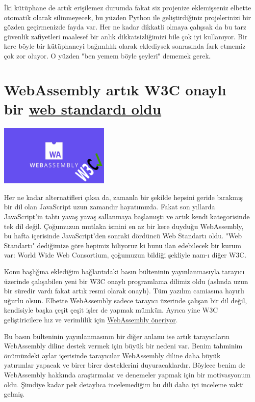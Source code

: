 \documentclass[11pt]{article}
\begin{document}
İki kütüphane de artık erişilemez durumda fakat siz projenize eklemişseniz
elbette otomatik olarak silinmeyecek, bu yüzden Python ile geliştirdiğiniz
projelerinizi bir gözden geçirmenizde fayda var. Her ne kadar dikkatli olmaya
çalışsak da bu tarz güvenlik zafiyetleri maalesef bir anlık dikkatsizliğimizi
bile çok iyi kullanıyor. Bir kere böyle bir kütüphaneyi bağımlılık olarak
eklediysek sonrasında fark etmemiz çok zor oluyor. O yüzden "ben yemem böyle
şeyleri" dememek gerek.
\section{WebAssembly artık W3C onaylı bir \href{https://www.w3.org/2019/12/pressrelease-wasm-rec.html.en}{web standardı oldu}}
\label{sec:org3f7b3a4}
\begin{center}
\includegraphics[height=3cm]{gorseller/webassembly-w3c.png}
\end{center}

Her ne kadar alternatifleri çıksa da, zamanla bir şekilde hepsini geride
bırakmış bir dil olan JavaScript uzun zamandır hayatımızda. Fakat son yıllarda
JavaScript'in tahtı yavaş yavaş sallanmaya başlamıştı ve artık kendi
kategorisinde tek dil değil. Çoğumuzun mutlaka ismini en az bir kere duyduğu
WebAssembly, bu hafta içerisinde JavaScript'den sonraki dördüncü Web Standartı
oldu. "Web Standartı" dediğimize göre hepimiz biliyoruz ki bunu ilan
edebilecek bir kurum var: World Wide Web Consortium, çoğumuzun bildiği
şekliyle nam-ı diğer W3C.

Konu başlığına eklediğim bağlantıdaki basın bülteninin yayınlanmasıyla
tarayıcı üzerinde çalışabilen yeni bir W3C onaylı programlama dilimiz oldu
(aslında uzun bir süredir vardı fakat artık resmi olarak onaylı). Tüm yazılım
camiasına hayırlı uğurlu olsun. Elbette WebAssembly sadece tarayıcı üzerinde
çalışan bir dil değil, kendisiyle başka çeşit çeşit işler de yapmak mümkün.
Ayrıca yine W3C geliştiricilere hız ve verimlilik için \href{https://www.w3.org/blog/news/archives/8123}{WebAssembly öneriyor}.

Bu basın bülteninin yayınlanmasının bir diğer anlamı ise artık tarayıcıların
WebAssembly diline destek vermek için büyük bir nedeni var. Benim tahminim
önümüzdeki aylar içerisinde tarayıcılar WebAssembly diline daha büyük
yatırımlar yapacak ve birer birer desteklerini duyuracaklardır. Böylece benim
de WebAssembly hakkında araştırmalar ve denemeler yapmak için bir motivasyonum
oldu. Şimdiye kadar pek detaylıca incelemediğim bu dili daha iyi inceleme
vakti gelmiş.
\end{document}

